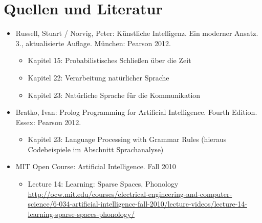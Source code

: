 \section{Quellen und Literatur}
\begin{itemize}
\item Russell, Stuart / Norvig, Peter: Künstliche Intelligenz. Ein moderner Ansatz.
3., aktualisierte Auflage. München: Pearson 2012.
\begin{itemize}
\item Kapitel 15: Probabilistisches Schließen über die Zeit
\item Kapitel 22: Verarbeitung natürlicher Sprache
\item Kapitel 23: Natürliche Sprache für die Kommunikation
\end{itemize}
\item Bratko, Ivan: Prolog Programming for Artificial Intelligence.
Fourth Edition. Essex: Pearson 2012.
\begin{itemize}
\item Kapitel 23: Language Processing with Grammar Rules
(hieraus Codebeispiele im Abschnitt Sprachanalyse)
\end{itemize}
\item MIT Open Course: Artificial Intelligence. Fall 2010
\begin{itemize}
\item Lecture 14: Learning: Sparse Spaces, Phonology
\url{http://ocw.mit.edu/courses/electrical-engineering-and-computer-science/6-034-artificial-intelligence-fall-2010/lecture-videos/lecture-14-learning-sparse-spaces-phonology/}
\end{itemize}
\end{itemize}

